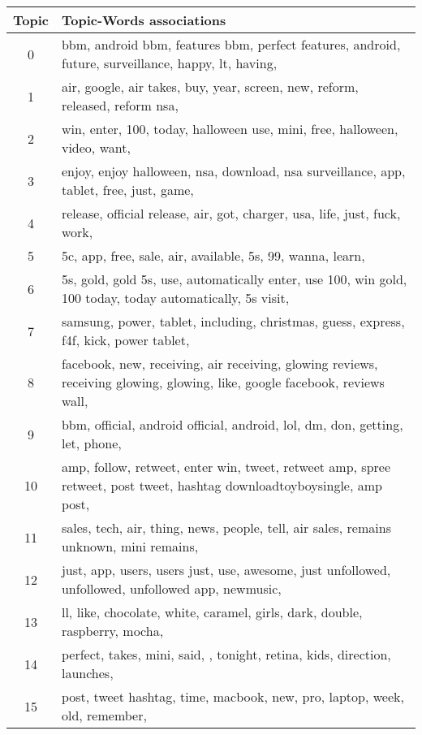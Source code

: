 \begin{table}
  \begin{tabular}{c p{16cm}} \toprule
    Topic & Topic-Words associations \\ \midrule
    0     & bbm, android bbm, features bbm, perfect features, android, future, surveillance, happy, lt, having, \\ \midrule
    1     & air, google, air takes, buy, year, screen, new, reform, released, reform nsa, \\ \midrule
    2     & win, enter, 100, today, halloween use, mini, free, halloween, video, want, \\ \midrule
    3     & enjoy, enjoy halloween, nsa, download, nsa surveillance, app, tablet, free, just, game, \\ \midrule
    4     & release, official release, air, got, charger, usa, life, just, fuck, work, \\ \midrule
    5     & 5c, app, free, sale, air, available, 5s, 99, wanna, learn, \\ \midrule
    6     & 5s, gold, gold 5s, use, automatically enter, use 100, win gold, 100 today, today automatically, 5s visit, \\ \midrule
    7     & samsung, power, tablet, including, christmas, guess, express, f4f, kick, power tablet, \\ \midrule
    8     & facebook, new, receiving, air receiving, glowing reviews, receiving glowing, glowing, like, google facebook, reviews wall, \\ \midrule
    9     & bbm, official, android official, android, lol, dm, don, getting, let, phone, \\ \midrule
    10    & amp, follow, retweet, enter win, tweet, retweet amp, spree retweet, post tweet, hashtag downloadtoyboysingle, amp post, \\ \midrule
    11    & sales, tech, air, thing, news, people, tell, air sales, remains unknown, mini remains, \\ \midrule
    12    & just, app, users, users just, use, awesome, just unfollowed, unfollowed, unfollowed app, newmusic, \\ \midrule
    13    & ll, like, chocolate, white, caramel, girls, dark, double, raspberry, mocha, \\ \midrule
    14    & perfect, takes, mini, said, , tonight, retina, kids, direction, launches, \\ \midrule
    15    & post, tweet hashtag, time, macbook, new, pro, laptop, week, old, remember, \\ \midrule

\end{tabular}
\end{table}
